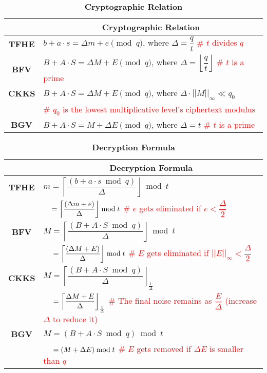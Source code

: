 \begin{table}[h]
\begin{tabular}{|c||l|}
\hline
&\multicolumn{1}{c|}{\textbf{Cryptographic Relation}}\\\hline\hline
\textbf{TFHE}&$b + a\cdot s = \Delta m + e \pmod q$, \text{ } where $\Delta = \dfrac{q}{t}$  \text{ } \textcolor{red}{\# $t$ divides $q$}\\\hline
\textbf{BFV}&$B + A\cdot S = \Delta M + E \pmod q$, \text{ } where $\Delta = \left\lfloor\dfrac{q}{t}\right\rfloor$ \text{ } \textcolor{red}{\# $t$ is a prime}\\\hline
\textbf{CKKS}&$B + A\cdot S = \Delta M + E \pmod q$, \text{ } where $\Delta \cdot ||M||_\infty \ll q_0$\\
& \text{ } \textcolor{red}{\# $q_0$ is the lowest multiplicative level's ciphertext modulus}\\\hline
\textbf{BGV}&$B + A\cdot S = M + \Delta E \pmod q$, \text{ } where $\Delta = t$  \text{ } \textcolor{red}{\# $t$ is a prime}\\\hline
\end{tabular}
\caption{\textbf{Cryptographic Relation}}
\end{table}


\begin{table}[h]
\begin{tabular}{|c||l|}
\hline
&\multicolumn{1}{c|}{\textbf{Decryption Formula}}\\\hline\hline
\textbf{TFHE}&$m = \left\lceil\dfrac{(b + a\cdot s \bmod q)}{\Delta}\right\rfloor \bmod t$\\
&$\textcolor{white}{m} = \left\lceil\dfrac{(\Delta m + e)}{\Delta}\right\rfloor \bmod t$ \text{ } \textcolor{red}{ \# $e$ gets eliminated if $e < \dfrac{\Delta}{2}$}\\\hline
\textbf{BFV}&$M = \left\lceil\dfrac{(B + A\cdot S \bmod q)}{\Delta}\right\rfloor  \bmod t$\\
&$\textcolor{white}{M} = \left\lceil\dfrac{(\Delta M + E)}{\Delta}\right\rfloor  \bmod t$ \text{ } \textcolor{red}{ \# $E$ gets eliminated if $||E||_\infty < \dfrac{\Delta}{2}$}\\\hline
\textbf{CKKS}&$M = \left\lceil\dfrac{(B + A\cdot S \bmod q)}{\Delta}\right\rfloor_{\frac{1}{\Delta}}$\\
&$\textcolor{white}{M} = \left\lceil\dfrac{\Delta M + E}{\Delta}\right\rfloor_{\frac{1}{\Delta}}$ \text{ } \textcolor{red}{ \# The final noise remains as $\dfrac{E}{\Delta}$ (increase $\Delta$ to reduce it)}\\\hline
\textbf{BGV}&$M = (B + A\cdot S \bmod q) \bmod t$\\
&$\textcolor{white}{M} = (M + \Delta E) \bmod t$ \text{ } \textcolor{red}{ \# $E$ gets removed if $\Delta E$ is smaller than $q$}\\\hline
\end{tabular}
\caption{\textbf{Decryption Formula}}
\end{table}

